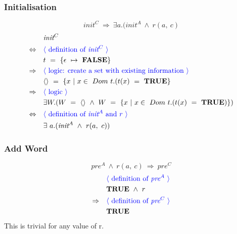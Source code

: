 \documentclass[a4paper, fleqn]{article}
\newcommand{\reason}[1]{\text{\textcolor{blue}{$\langle$ #1 $\rangle$}}}
\begin{document}
\subsubsection{Initialisation}
$$\textit{init}^{C}\ \Rightarrow\ \exists a.(\textit{init}^{A}\ \land\ r(a,\ c)$$
\begin{align*}
		&\quad \textit{init}^{C}\\
		\Leftrightarrow&\quad \reason{definition of $\textit{init}^C$} \\
		&\quad t\ =\ \{\epsilon\ \mapsto\ \textbf{FALSE}\} \\
		\Rightarrow&\quad\reason{logic: create a set with existing information} \\
		&\quad \langle\rangle\ =\ \{x\ |\ x\in\ Dom\ t.(t(x)\ =\ \textbf{TRUE}\} \\
		\Rightarrow&\quad\reason{logic} \\
		&\quad\exists W.(W\ =\ \langle\rangle\ \land\ W\ =\ \{x\ |\ x\in\ Dom\ t.(t(x)\ =\ \textbf{TRUE})\})\\
		\Leftrightarrow&\quad \reason{definition of $\textit{init}^A$ and $r$} \\
		&\quad\exists\ a.(\textit{init}^A\ \land\ r(a,\ c))
\end{align*}

\subsubsection{Add Word}
$$\textit{pre}^A\ \land\ r(a,\ c)\ \Rightarrow\ \textit{pre}^{C}$$
\begin{align*}
		&\quad \reason{definition of $\textit{pre}^{A}$} \\
		&\quad \textbf{TRUE}\ \land\ r\\
		\Rightarrow&\quad \reason{definition of $\textit{pre}^{C}$} \\
		&\quad \textbf{TRUE} 
\end{align*}
This is trivial for any value of r.
\end{document}
